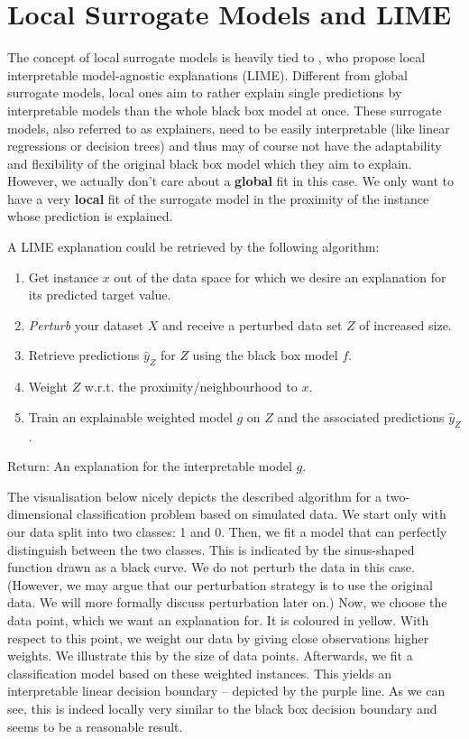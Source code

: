 \documentclass[]{krantz}
\begin{document}
\section{Local Surrogate Models and
LIME}\label{local-surrogate-models-and-lime}

The concept of local surrogate models is heavily tied to
\citet{ribeiro2016should}, who propose local interpretable
model-agnostic explanations (LIME). Different from global surrogate
models, local ones aim to rather explain single predictions by
interpretable models than the whole black box model at once. These
surrogate models, also referred to as explainers, need to be easily
interpretable (like linear regressions or decision trees) and thus may
of course not have the adaptability and flexibility of the original
black box model which they aim to explain. However, we actually don't
care about a \textbf{global} fit in this case. We only want to have a
very \textbf{local} fit of the surrogate model in the proximity of the
instance whose prediction is explained.

A LIME explanation could be retrieved by the following algorithm:

\begin{enumerate}
\def\labelenumi{\arabic{enumi}.}
\item
  Get instance \(x\) out of the data space for which we desire an
  explanation for its predicted target value.
\item
  \emph{Perturb} your dataset \(X\) and receive a perturbed data set
  \(Z\) of increased size.
\item
  Retrieve predictions \(\hat{y}_{Z}\) for \(Z\) using the black box
  model \(f\).
\item
  Weight \(Z\) w.r.t. the proximity/neighbourhood to \(x\).
\item
  Train an explainable weighted model \(g\) on \(Z\) and the associated
  predictions \(\hat{y}_{Z}\).
\end{enumerate}

Return: An explanation for the interpretable model \(g\).

The visualisation below nicely depicts the described algorithm for a
two-dimensional classification problem based on simulated data. We start
only with our data split into two classes: 1 and 0. Then, we fit a model
that can perfectly distinguish between the two classes. This is
indicated by the sinus-shaped function drawn as a black curve. We do not
perturb the data in this case. (However, we may argue that our
perturbation strategy is to use the original data. We will more formally
discuss perturbation later on.) Now, we choose the data point, which we
want an explanation for. It is coloured in yellow. With respect to this
point, we weight our data by giving close observations higher weights.
We illustrate this by the size of data points. Afterwards, we fit a
classification model based on these weighted instances. This yields an
interpretable linear decision boundary -- depicted by the purple line.
As we can see, this is indeed locally very similar to the black box
decision boundary and seems to be a reasonable result.
\end{document}
